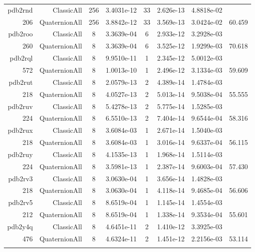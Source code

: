 \begin{xltabular}{\textwidth}{r|rcS[table-format=1.4e+2]cS[table-format=1.3e+2]S[table-format=1.4e+2]S[table-format=-1.3]}
pdb2rnd & ClassicAll & 256 & 3.4031e-12 & 33 & 2.626e-13 & 4.8818e-02 & \\
206 & QuaternionAll & 256 & 3.8842e-12 & 33 & 3.569e-13 & 3.0424e-02 & 60.459\\  \addlinespace
pdb2roo & ClassicAll & 8 & 3.3639e-04 & 6 & 2.933e-12 & 3.2928e-03 & \\
260 & QuaternionAll & 8 & 3.3639e-04 & 6 & 3.525e-12 & 1.9299e-03 & 70.618\\  \addlinespace
pdb2rql & ClassicAll & 8 & 9.9510e-11 & 1 & 2.345e-12 & 5.0012e-03 & \\
572 & QuaternionAll & 8 & 1.0013e-10 & 1 & 2.496e-12 & 3.1334e-03 & 59.609\\  \addlinespace
pdb2rut & ClassicAll & 8 & 2.0579e-13 & 2 & 4.389e-14 & 1.4784e-03 & \\
218 & QuaternionAll & 8 & 4.0527e-13 & 2 & 5.013e-14 & 9.5038e-04 & 55.555\\  \addlinespace
pdb2ruv & ClassicAll & 8 & 5.4278e-13 & 2 & 5.775e-14 & 1.5285e-03 & \\
224 & QuaternionAll & 8 & 6.5510e-13 & 2 & 7.404e-14 & 9.6544e-04 & 58.316\\  \addlinespace
pdb2rux & ClassicAll & 8 & 3.6084e-03 & 1 & 2.671e-14 & 1.5040e-03 & \\
218 & QuaternionAll & 8 & 3.6084e-03 & 1 & 3.016e-14 & 9.6337e-04 & 56.115\\  \addlinespace
pdb2ruy & ClassicAll & 8 & 4.1535e-13 & 1 & 1.968e-14 & 1.5114e-03 & \\
224 & QuaternionAll & 8 & 3.5981e-13 & 1 & 2.387e-14 & 9.6003e-04 & 57.430\\  \addlinespace
pdb2rv3 & ClassicAll & 8 & 3.0630e-04 & 1 & 3.656e-14 & 1.4828e-03 & \\
218 & QuaternionAll & 8 & 3.0630e-04 & 1 & 4.118e-14 & 9.4685e-04 & 56.606\\  \addlinespace
pdb2rv5 & ClassicAll & 8 & 8.6519e-04 & 1 & 1.145e-14 & 1.4554e-03 & \\
212 & QuaternionAll & 8 & 8.6519e-04 & 1 & 1.338e-14 & 9.3534e-04 & 55.601\\  \addlinespace
pdb2y4q & ClassicAll & 8 & 4.6451e-11 & 2 & 1.410e-12 & 3.3925e-03 & \\
476 & QuaternionAll & 8 & 4.6324e-11 & 2 & 1.451e-12 & 2.2156e-03 & 53.114\\  \addlinespace
\end{xltabular}
